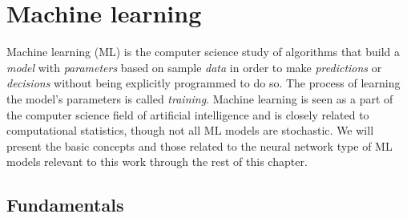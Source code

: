 


\section{Machine learning}
Machine learning (ML) is the computer science study of algorithms that build a \emph{model} with \emph{parameters} based on sample \emph{data} in order to make \emph{predictions} or \emph{decisions} without being explicitly programmed to do so. The process of learning the model's parameters is called \emph{training}. Machine learning is seen as a part of the computer science field of artificial intelligence and is closely related to computational statistics, though not all ML models are stochastic. We will present the basic concepts and those related to the neural network type of ML models relevant to this work through the rest of this chapter. 

\subsection{Fundamentals}

